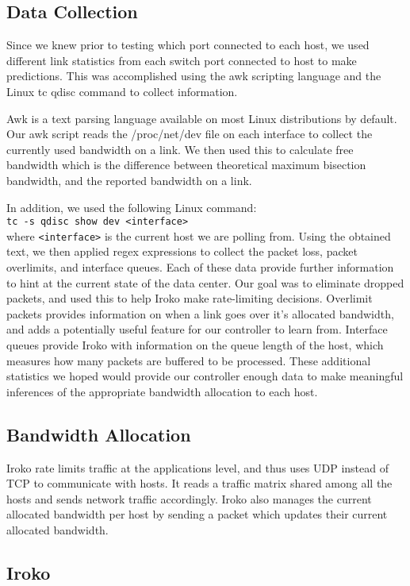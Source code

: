 \subsection{Data Collection }
Since we knew prior to testing which port connected to each host, we used different link statistics from each switch port connected to host to make predictions. This was accomplished using the awk scripting language and the Linux tc qdisc command to collect information.

Awk is a text parsing language available on most Linux distributions by default. Our awk script reads the /proc/net/dev file on each interface to collect the currently used  bandwidth on a link. We then used this to calculate free bandwidth which is the difference between theoretical maximum bisection bandwidth, and the reported bandwidth on a link.

In addition, we used the following Linux command:\\
\texttt{tc -s qdisc show dev <interface>}\\
where \texttt{<interface>} is the current host we are polling from. Using the 
obtained text, we then applied regex expressions to collect the packet loss, 
packet overlimits, and interface queues. Each of these data provide further 
information to hint at the current state of the data center. Our goal was to 
eliminate dropped packets, and used this to help Iroko make rate-limiting 
decisions. Overlimit packets provides information on when a link goes over it’s 
allocated bandwidth, and adds a potentially useful feature for our controller 
to learn from. Interface queues provide Iroko with information on the queue 
length of the host, which measures how many packets are buffered to be 
processed.  These additional statistics we hoped would provide our controller 
enough data to make meaningful inferences of the appropriate bandwidth 
allocation to each host. 

\subsection{Bandwidth Allocation}
Iroko rate limits traffic at the applications level, and thus uses UDP instead of TCP to communicate with hosts. It reads a traffic matrix shared among all the hosts and sends network traffic accordingly. Iroko also manages the current allocated bandwidth per host by sending a packet which updates their current allocated bandwidth.


\subsection{Iroko}

